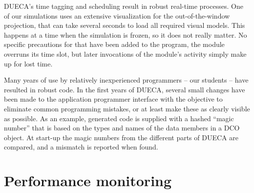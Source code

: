 \documentclass[11pt,a4paper,twoside]{scrartcl}
\begin{document}
DUECA's time tagging and scheduling result in robust real-time processes. One of our simulations uses an extensive visualization for the out-of-the-window projection, that can take several seconds to load all required visual models. This happens at a time when the simulation is frozen, so it does not really matter. No specific precautions for that have been added to the program, the module overruns its time slot, but later invocations of the module's activity simply make up for lost time.

Many years of use by relatively inexperienced programmers -- our students -- have resulted in robust code. In the first years of DUECA, several small changes have been made to the application programmer interface with the objective to eliminate common programming mistakes, or at least make these as clearly visible as possible. As an example, generated code is supplied with a hashed ``magic number'' that is based on the types and names of the data members in a DCO object. At start-up the magic numbers from the different parts of DUECA are compared, and a mismatch is reported when found.

\section{Performance monitoring}
\end{document}
